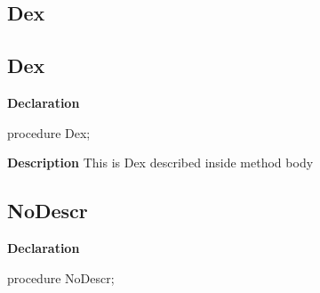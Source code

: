 \documentclass{report}
\newif\ifpdf
\begin{document}
\subsection*{\large{\textbf{Dex}}\normalsize\hspace{1ex}\hrulefill}
\else
\subsection*{Dex}
\fi
\label{ok_parse_impl-Dex}
\begin{list}{}{
\setlength{\itemindent}{0cm}
\setlength{\listparindent}{0cm}
\setlength{\leftmargin}{\evensidemargin}
\addtolength{\leftmargin}{\tmplength}
\settowidth{\labelsep}{X}
\addtolength{\leftmargin}{\labelsep}
\setlength{\labelwidth}{\tmplength}
}
\item[\textbf{Declaration}\hfill]
\ifpdf
\begin{flushleft}
\fi
\begin{ttfamily}
procedure Dex;\end{ttfamily}

\ifpdf
\end{flushleft}
\fi

\par
\item[\textbf{Description}]
This is Dex described inside method body

\end{list}
\ifpdf
\subsection*{\large{\textbf{NoDescr}}\normalsize\hspace{1ex}\hrulefill}
\else
\subsection*{NoDescr}
\fi
\label{ok_parse_impl-NoDescr}
\begin{list}{}{
\setlength{\itemindent}{0cm}
\setlength{\listparindent}{0cm}
\setlength{\leftmargin}{\evensidemargin}
\addtolength{\leftmargin}{\tmplength}
\settowidth{\labelsep}{X}
\addtolength{\leftmargin}{\labelsep}
\setlength{\labelwidth}{\tmplength}
}
\item[\textbf{Declaration}\hfill]
\ifpdf
\begin{flushleft}
\fi
\begin{ttfamily}
procedure NoDescr;\end{ttfamily}

\ifpdf
\end{flushleft}
\fi

\end{list}
\ifpdf
\end{document}
